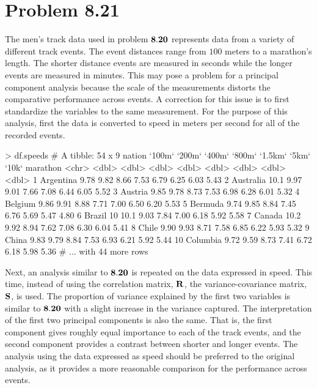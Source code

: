 \newpage
\section*{Problem 8.21} 
The men's track data used in problem $\bf{8.20}$ represents data from a variety of different track events. The event distances range from $100$ meters to a marathon's length. The shorter distance events are measured in seconds while the longer events are measured in minutes. This may pose a problem for a principal component analysis because the scale of the measurements distorts the comparative performance across events. A correction for this issue is to first standardize the variables to the same measurement. For the purpose of this analysis, first the data is converted to speed in meters per second for all of the recorded events.

\begin{rc}

> df.speeds
# A tibble: 54 x 9
   nation    `100m` `200m` `400m` `800m` `1.5km` `5km` `10k` marathon
   <chr>      <dbl>  <dbl>  <dbl>  <dbl>   <dbl> <dbl> <dbl>    <dbl>
 1 Argentina   9.78   9.82   8.66   7.53    6.79  6.25  6.03     5.43
 2 Australia  10.1    9.97   9.01   7.66    7.08  6.44  6.05     5.52
 3 Austria     9.85   9.78   8.73   7.53    6.98  6.28  6.01     5.32
 4 Belgium     9.86   9.91   8.88   7.71    7.00  6.50  6.20     5.53
 5 Bermuda     9.74   9.85   8.84   7.45    6.76  5.69  5.47     4.80
 6 Brazil     10     10.1    9.03   7.84    7.00  6.18  5.92     5.58
 7 Canada     10.2    9.92   8.94   7.62    7.08  6.30  6.04     5.41
 8 Chile       9.90   9.93   8.71   7.58    6.85  6.22  5.93     5.32
 9 China       9.83   9.79   8.84   7.53    6.93  6.21  5.92     5.44
10 Columbia    9.72   9.59   8.73   7.41    6.72  6.18  5.98     5.36
# ... with 44 more rows
\end{rc}

Next, an analysis similar to $\bf{8.20}$ is repeated on the data expressed in speed. This time, instead of using the correlation matrix, $\bf{R}$, the variance-covariance matrix, $\bf{S}$, is used. The proportion of variance explained by the first two variables is similar to $\bf{8.20}$ with a slight increase in the variance captured. The interpretation of the first two principal components is also the same. That is, the first component gives roughly equal importance to each of the track events, and the second component provides a contrast between shorter and longer events. The analysis using the data expressed as speed should be preferred to the original analysis, as it provides a more reasonable comparison for the performance across events.

